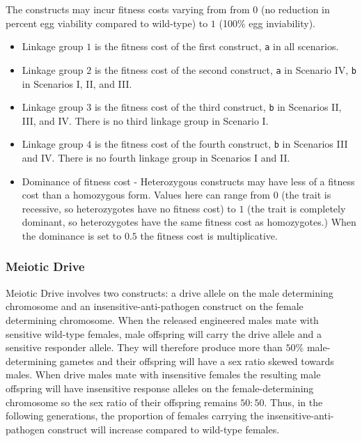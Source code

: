 \documentclass[11pt]{article}
\newcommand{\linecmd}[1]{\texttt{#1}}
\begin{document}
The constructs may incur fitness costs varying from from $0$ (no reduction in percent egg viability compared to wild-type) to $1$ (100\% egg inviability). 
\begin{itemize}
	\item Linkage group $1$ is the fitness cost of the first construct, \linecmd{a} in all scenarios.
	\item Linkage group $2$ is the fitness cost of the second construct, \linecmd{a} in Scenario IV, \linecmd{b} in Scenarios I, II, and III. 
	\item Linkage group $3$ is the fitness cost of the third construct, \linecmd{b} in Scenarios II, III, and IV. There is no third linkage group in Scenario I.
	\item Linkage group $4$ is the fitness cost of the fourth construct, \linecmd{b} in Scenarios III and IV. There is no fourth linkage group in Scenarios I and II.
	\item Dominance of fitness cost - Heterozygous constructs may have less of a fitness cost than a homozygous form. Values here can range from $0$ (the trait is recessive, so heterozygotes have no fitness cost) to $1$ (the trait is completely dominant, so heterozygotes have the same fitness cost as homozygotes.) When the dominance is set to $0.5$ the fitness cost is multiplicative.
\end{itemize}

\subsubsection{Meiotic Drive}%

Meiotic Drive involves two constructs: a drive allele on the male determining chromosome and an insensitive-anti-pathogen construct on the female determining chromosome. When the released engineered males mate with sensitive wild-type females, male offspring will carry the drive allele and a sensitive responder allele. They will therefore produce more than $50\%$ male-determining gametes and their offspring will have a sex ratio skewed towards males. When drive males mate with insensitive females the resulting male offspring will have insensitive response alleles on the female-determining chromosome so the sex ratio of their offspring remains $50:50$. Thus, in the following generations, the proportion of females carrying the insensitive-anti-pathogen construct will increase compared to wild-type females.%
\end{document}
